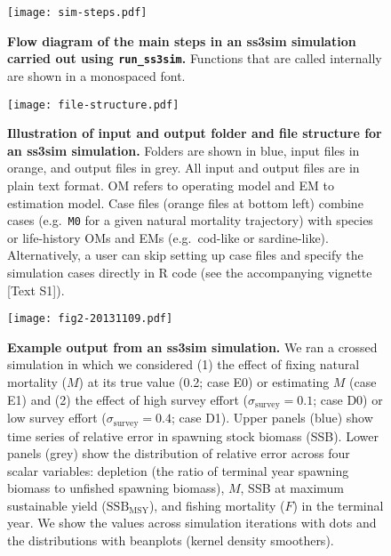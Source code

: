 \documentclass[11pt]{article}
\begin{document}
\begin{spacing}{1.2}
\begin{figure}[!ht]
 \begin{center}
 \texttt{[image: sim-steps.pdf]}
 \end{center}
\caption{
{\bf Flow diagram of the main steps in an ss3sim simulation carried out using
  \texttt{run\_ss3sim}.} Functions that are called internally are shown in a
monospaced font.
}
\label{fig:sim-steps}
\end{figure}

\clearpage

\begin{figure}[!ht]
 \begin{center}
 \texttt{[image: file-structure.pdf]}
 \end{center}
\caption{
{\bf Illustration of input and output folder and file structure for an ss3sim
  simulation.} Folders are shown in blue, input files in orange, and output
files in grey. All input and output files are in plain text format. OM refers
to operating model and EM to estimation model. Case files (orange files at
bottom left) combine cases (e.g.~\texttt{M0} for a given natural mortality
trajectory) with species or life-history OMs and EMs (e.g.~cod-like or
sardine-like). Alternatively, a user can skip setting up case files and specify
the simulation cases directly in \textsf{R} code (see the accompanying vignette
[Text S1]).
}
\end{figure}

\clearpage

\begin{figure}[!ht]
 \begin{center}
 \texttt{[image: fig2-20131109.pdf]}
 \end{center}
\caption{
{\bf Example output from an ss3sim simulation.} We ran a crossed simulation in
which we considered (1) the effect of fixing natural mortality ($M$) at its
true value (0.2; case E0) or estimating $M$ (case E1) and (2) the effect of
high survey effort ($\sigma_\mathrm{survey} = 0.1$; case D0) or low survey
effort ($\sigma_\mathrm{survey} = 0.4$; case D1). Upper panels (blue) show time
series of relative error in spawning stock biomass (SSB). Lower panels (grey)
show the distribution of relative error across four scalar variables: depletion
(the ratio of terminal year spawning biomass to unfished spawning biomass),
$M$, SSB at maximum sustainable yield ($\mathrm{SSB}_\mathrm{MSY}$), and
fishing mortality ($F$) in the terminal year. We show the values across
simulation iterations with dots and the distributions with beanplots (kernel
density smoothers).
}
\label{fig:results}
\end{figure}


\end{spacing}
\end{document}
